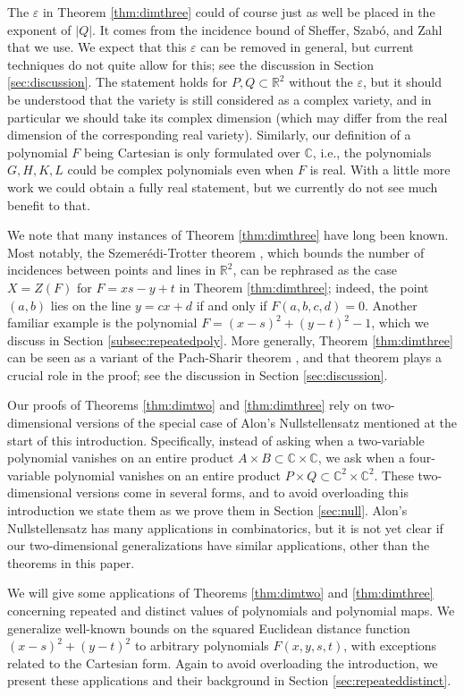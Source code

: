 \documentclass{daj}
\theoremstyle{definition}
\newcommand{\C}{\mathbb C}
\newcommand{\R}{\mathbb R}
\newcommand{\eps}{\varepsilon}
\begin{document}
The $\eps$ in Theorem \ref{thm:dimthree} could of course just as well be placed in the exponent of $|Q|$.
It comes from the incidence bound of Sheffer, Szab\'o, and Zahl \cite{SSZ} that we use.
We expect that this $\eps$ can be removed in general, but current techniques do not quite allow for this; see the discussion in Section \ref{sec:discussion}.
The statement holds for $P,Q\subset \R^2$ without the $\eps$, 
but it should be understood that the variety is still considered as a complex variety, and in particular we should take its complex dimension (which may differ from the real dimension of the corresponding real variety).
Similarly,
our definition of a polynomial $F$ being Cartesian is only formulated over $\C$, i.e., the polynomials $G,H,K,L$ could be complex polynomials even when $F$ is real.
With a little more work we could obtain a fully real statement,
but we currently do not see much benefit to that.

We note that many instances of Theorem \ref{thm:dimthree} have long been known.
Most notably, the Szemer\'edi-Trotter theorem \cite{ST}, which bounds the number of incidences between points and lines in $\R^2$, 
can be rephrased as the case $X=Z(F)$ for $F=xs-y+t$ in  Theorem \ref{thm:dimthree}; indeed, the point $(a,b)$ lies on the line $y=cx+d$ if and only if $F(a,b,c,d)=0$.
Another familiar example is the polynomial $F = (x-s)^2 + (y-t)^2 -1$, which we discuss in Section \ref{subsec:repeatedpoly}.
More generally, Theorem \ref{thm:dimthree} can be seen as a variant of the Pach-Sharir theorem \cite{PS}, and that theorem plays a crucial role in the proof; see the discussion in Section \ref{sec:discussion}.


Our proofs of Theorems \ref{thm:dimtwo} and \ref{thm:dimthree} rely on two-dimensional versions of the special case of Alon's Nullstellensatz mentioned at the start of this introduction.
Specifically, instead of asking when a two-variable polynomial vanishes on an entire product $A\times B\subset \C\times \C$,
we ask when a four-variable polynomial vanishes on an entire product $P\times Q\subset \C^2\times \C^2$.
These two-dimensional versions come in several forms, 
and to avoid overloading this introduction we state them as we prove them in Section \ref{sec:null}.
Alon's Nullstellensatz has many applications in combinatorics, but it is not yet clear if our two-dimensional generalizations have similar applications, other than the theorems in this paper.


We will give some applications of Theorems \ref{thm:dimtwo} and \ref{thm:dimthree} concerning repeated and distinct values of polynomials and polynomial maps.
We generalize well-known bounds on the squared Euclidean distance function $(x-s)^2+(y-t)^2$ to arbitrary polynomials $F(x,y,s,t)$, with exceptions related to the Cartesian form.
Again to avoid overloading the introduction, we present these applications and their background in Section \ref{sec:repeateddistinct}.
\end{document}
